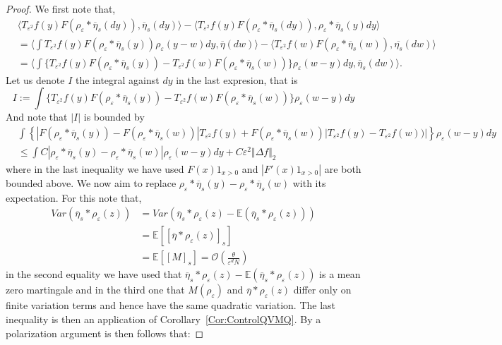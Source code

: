 \documentclass[a4paper,12pt]{article}
\newcommand{\EE}{\mathbb{E}}
\newcommand{\1}{{\bf {1}}}
\def\epsilon{\varepsilon}
\begin{document}
\begin{proof}
We first note that,
\begin{align*}
    &\langle T_{\epsilon^2} f(y) F(\rho_\epsilon *\overline{\eta}_s(dy)), \overline{\eta}_s(dy) \rangle - \langle T_{\epsilon^2} f(y) F(\rho_\epsilon * \overline{\eta}_s(dy)), \rho_\epsilon * \overline{\eta}_s(y) dy \rangle \\ & = \langle \int T_{\epsilon^2} f(y) F(\rho_\epsilon * \overline{\eta}_s(y))\rho_\epsilon(y-w) dy, \overline{\eta}(dw)\rangle - \langle T_{\epsilon^2} f(w) F(\rho_\epsilon*\overline{\eta}_s(w)), \overline{\eta_s}(dw) \rangle \\ &= \langle \int \{ T_{\epsilon^2} f(y) F(\rho_\epsilon*\overline{\eta}_s(y))-T_{\epsilon^2}f(w) F(\rho_\epsilon*\overline{\eta}_s(w))\} \rho_\epsilon(w-y)dy, \overline{\eta}_s(dw) \rangle.
\end{align*}
Let us denote $I$ the integral against $dy$ in the last expresion, that is 
\[ I :=  \int \{ T_{\epsilon^2} f(y) F(\rho_\epsilon*\overline{\eta}_s(y))-T_{\epsilon^2}f(w) F(\rho_\epsilon*\overline{\eta}_s(w))\} \rho_\epsilon(w-y)dy \]
And note that $|I|$ is bounded by
\begin{align}
& \int \left\{ |F(\rho_\epsilon*\overline{\eta}_s(y))-F(\rho_\epsilon*\overline{\eta}_s(w))|T_{\epsilon^2}f(y)+F(\rho_\epsilon*\overline{\eta}_s(w))|T_{\epsilon^2}f(y)-T_{\epsilon^2}f(w))|\right\} \rho_{\epsilon}(w-y)dy \nonumber \\ &\leq \int C |\rho_\epsilon*\overline{\eta}_s(y)-\rho_\epsilon*\overline{\eta}_s(w)| \rho_\epsilon(w-y)dy + C \epsilon^2 \Vert \Delta f \Vert_2 \label{FirstBoundCT}
\end{align}
where in the last inequality we have used $F(x)1_{x>0}$ and $|F'(x)1_{x>0}|$ are both bounded above. We now aim to replace $\rho_\epsilon*\overline{\eta}_s(y)-\rho_\epsilon*\overline{\eta}_s(w)$ with its expectation. For this note that, 
\begin{align}
Var( \overline{\eta}_s*\rho_\epsilon(z)) &=  Var( \overline{\eta}_s*\rho_\epsilon(z) - \mathbb{E}(\overline{\eta}_s*\rho_\epsilon(z))) \nonumber \\ &= \EE[ [ \overline{\eta}*\rho_\epsilon(z) ]_s] \nonumber \\ &= \EE[ [ M]_s ] = \mathcal{O}\left( \frac{\theta}{\epsilon^{d} N} \right) \label{eq:AlmostDeterministic}
\end{align}
in the second equality we have used that $\overline{\eta}_s*\rho_\epsilon(z) - \mathbb{E}(\overline{\eta}_s*\rho_\epsilon(z))$ is a mean zero martingale and in the third one that $M(\rho_\epsilon)$ and $\overline{\eta} * \rho_\epsilon(z)$ differ only on finite variation terms and hence have the same quadratic variation. The last inequality is then an application of Corollary~\ref{Cor:ControlQVMQ}. By a polarization argument is then follows that: 

\end{proof}
\end{document}
